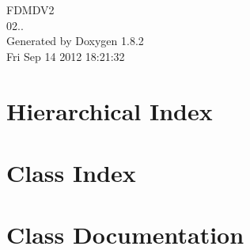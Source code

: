 \documentclass{book}
\begin{document}
\hypersetup{pageanchor=false,citecolor=blue}
\begin{titlepage}
\vspace*{7cm}
\begin{center}
{\Large F\-D\-M\-D\-V2 \\[1ex]\large 02.. }\\
\vspace*{1cm}
{\large Generated by Doxygen 1.8.2}\\
\vspace*{0.5cm}
{\small Fri Sep 14 2012 18:21:32}\\
\end{center}
\end{titlepage}
\clearemptydoublepage
{}
\tableofcontents
\clearemptydoublepage
{}
\hypersetup{pageanchor=true,citecolor=blue}
\chapter{Hierarchical Index}

\chapter{Class Index}

\chapter{Class Documentation}



















\printindex
\end{document}

